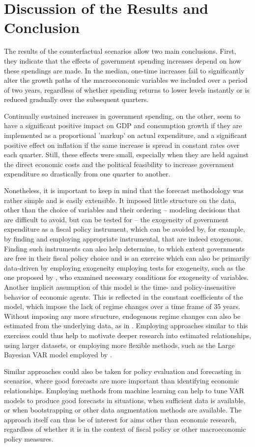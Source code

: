 \section{Discussion of the Results and Conclusion}

The results of the counterfactual scenarios allow two main conclusions. First, they indicate that the effects of government spending increases depend on how these spendings are made. In the median, one-time increases fail to significantly alter the growth paths of the macroeconomic variables we included over a period of two years, regardless of whether spending returns to lower levels instantly or is reduced gradually over the subsequent quarters.

Continually sustained increases in government spending, on the other, seem to have a significant positive impact on GDP and consumption growth if they are implemented as a proportional 'markup' on actual expenditure, and a significant positive effect on inflation if the same increase is spread in constant rates over each quarter. Still, these effects were small, especially when they are held against the direct economic costs and the political feasibility to increase government expenditure so drastically from one quarter to another. 

Nonetheless, it is important to keep in mind that the forecast methodology was rather simple and is easily extensible. It imposed little structure on the data, other than the choice of variables and their ordering -- modeling decisions that are difficult to avoid, but can be tested for -- the exogeneity of government expenditure as a fiscal policy instrument, which can be avoided by, for example, by finding and employing appropriate instrumental, that are indeed exogenous. Finding such instruments can also help determine, to which extent governments are free in their fiscal policy choice and is an exercise which can also be primarily data-driven by employing exogeneity employing tests for exogeneity, such as the one proposed by \citet{ericsson1998}, who examined necessary conditions for exogeneity of variables. Another implicit assumption of this model is the time- and policy-insensitive behavior of economic agents. This is reflected in the constant coefficients of the model, which impose the lack of regime changes over a time frame of 35 years. Without imposing any more structure, endogenous regime changes can also be estimated from the underlying data, as in \citet{kim2008}. Employing approaches similar to this exercises could thus help to motivate deeper research into estimated relationships, using larger datasets, or employing more flexible methods, such as the Large Bayesian VAR model employed by \citeauthor{kapetanios2012}.

Similar approaches could also be taken for policy evaluation and forecasting in scenarios, where good forecasts are more important than identifying economic relationships. Employing methods from machine learning can help to tune VAR models to produce good forecasts in situations, when sufficient data is available, or when bootstrapping or other data augmentation methods are available. The approach itself can thus be of interest for aims other than economic research, regardless of whether it is in the context of fiscal policy or other macroeconomic policy measures.